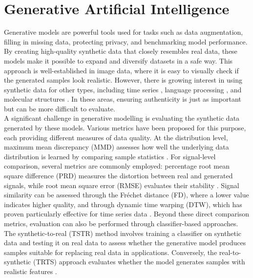 \section{Generative Artificial Intelligence}

Generative models are powerful tools used for tasks such as data augmentation, filling in missing data, protecting privacy, and benchmarking model performance. By creating high-quality synthetic data that closely resembles real data, these models make it possible to expand and diversify datasets in a safe way. This approach is well-established in image data, where it is easy to visually check if the generated samples look realistic. However, there is growing interest in using synthetic data for other types, including time series \cite{mogren_c-rnn-gan_2016, esteban_real-valued_2017, yu_seqgan_2017, kong_diffwave_2021}, language processing \cite{yu_seqgan_2017, li_adversarial_2017}, and molecular structures \cite{hawkins-hooker_generating_2021, repecka_expanding_2021}. In these areas, ensuring authenticity is just as important but can be more difficult to evaluate.
\\ 
A significant challenge in generative modelling is evaluating the synthetic data generated by these models. Various metrics have been proposed for this purpose, each providing different measures of data quality. At the distribution level, maximum mean discrepancy (MMD) assesses how well the underlying data distribution is learned by comparing sample statistics \cite{esteban_real-valued_2017}. For signal-level comparison, several metrics are commonly employed: percentage root mean square difference (PRD) measures the distortion between real and generated signals, while root mean square error (RMSE) evaluates their stability \cite{zhu_electrocardiogram_2019}. Signal similarity can be assessed through the Fréchet distance (FD), where a lower value indicates higher quality, and through dynamic time warping (DTW), which has proven particularly effective for time series data \cite{zhu_electrocardiogram_2019, delaney_synthesis_2019, serra_empirical_2014}. Beyond these direct comparison metrics, evaluation can also be performed through classifier-based approaches. The synthetic-to-real (TSTR) method involves training a classifier on synthetic data and testing it on real data to assess whether the generative model produces samples suitable for replacing real data in applications. Conversely, the real-to-synthetic (TRTS) approach evaluates whether the model generates samples with realistic features \cite{esteban_real-valued_2017}.
